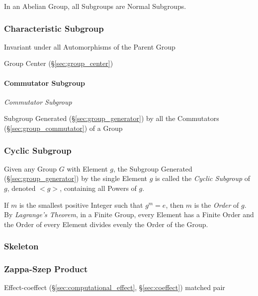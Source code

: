 In an Abelian Group, all Subgroups are Normal Subgroups.



\subsubsection{Characteristic Subgroup}\label{sec:characteristic_subgroup}

Invariant under all Automorphisms of the Parent Group

Group Center (\S\ref{sec:group_center})



\paragraph{Commutator Subgroup}\label{sec:commutator_subgroup}\hfill

\emph{Commutator Subgroup}

Subgroup Generated (\S\ref{sec:group_generator}) by all the
Commutators (\S\ref{sec:group_commutator}) of a Group



\subsubsection{Cyclic Subgroup}\label{sec:cyclic_subgroup}

Given any Group $G$ with Element $g$, the Subgroup Generated
(\S\ref{sec:group_generator}) by the single Element $g$ is called the
\emph{Cyclic Subgroup} of $g$, denoted $<g>$, containing all Powers of
$g$.

If $m$ is the smallest positive Integer such that $g^m = e$, then $m$
is the \emph{Order} of $g$. By \emph{Lagrange's Theorem}, in a Finite
Group, every Element has a Finite Order and the Order of every Element
divides evenly the Order of the Group.



\subsubsection{Skeleton}\label{sec:group_skeleton}

\subsubsection{Zappa-Szep Product}\label{sec:zappa_szep}

Effect-coeffect (\S\ref{sec:computational_effect},
\S\ref{sec:coeffect}) matched pair



